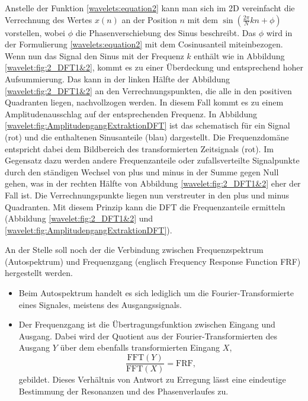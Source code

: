 Anstelle der Funktion \eqref{wavelets:equation2} kann man sich im
2D vereinfacht die Verrechnung des Wertes $x(n)$ an der Position
$n$ mit dem $\sin(\frac{2\pi}{N}kn+\phi)$ vorstellen, wobei $\phi$
die Phasenverschiebung des Sinus beschreibt.
Das $\phi$  wird in der Formulierung \eqref{wavelets:equation2} mit
dem Cosinusanteil miteinbezogen.
Wenn nun das Signal den Sinus mit der Frequenz $k$ enthält wie in
Abbildung \ref{wavelet:fig:2_DFT1&2}, kommt es zu einer Überdeckung
und entsprechend hoher Aufsummierung.
Das kann in der linken Hälfte der Abbildung \ref{wavelet:fig:2_DFT1&2}
an den Verrechnungspunkten, die alle in den positiven Quadranten
liegen, nachvollzogen werden.
In diesem Fall kommt es zu einem Amplitudenausschlag auf der
entsprechenden Frequenz.
In Abbildung \ref{wavelet:fig:AmplitudengangExtraktionDFT} ist das
schematisch für ein Signal (rot) und die enthaltenen Sinusanteile
(blau) dargestellt.
Die Frequenzdomäne entspricht dabei dem Bildbereich des transformierten
Zeitsignals (rot).
Im Gegensatz dazu werden andere Frequenzanteile oder zufallsverteilte
Signalpunkte durch den ständigen Wechsel von plus und minus in der
Summe gegen Null gehen, was in der rechten Hälfte von Abbildung
\ref{wavelet:fig:2_DFT1&2} eher der Fall ist.
Die Verrechnungspunkte liegen nun verstreuter in den plus und minus
Quadranten.
Mit diesem Prinzip kann die DFT die Frequenzanteile ermitteln
(Abbildung \ref{wavelet:fig:2_DFT1&2} und
\ref{wavelet:fig:AmplitudengangExtraktionDFT}).

An der Stelle soll noch der die Verbindung zwischen Frequenzspektrum
(Autospektrum) und Frequenzgang (englisch Frequency Response Function
FRF) hergestellt werden.

\begin{itemize}
	\item Beim Autospektrum handelt es sich lediglich um die
	Fourier-Transformierte eines Signales, meistens des
	Ausgangssignals.
	\item Der Frequenzgang ist die Übertragungsfunktion zwischen
	Eingang und Ausgang.
	Dabei wird der Quotient aus der
	Fourier-Transformierten des Ausgang $Y$ über dem ebenfalls
	transformierten Eingang $X$,
	\[
	\frac{\text{FFT}(Y)}{\text{FFT}(X)} = \text{FRF},
	\]
	gebildet.
	Dieses Verhältnis von Antwort zu Erregung lässt eine
	eindeutige Bestimmung der Resonanzen und des Phasenverlaufes
	zu.
\end{itemize}

